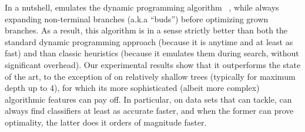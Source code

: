 \documentclass{article}
\begin{document}
In a nutshell, \budalg emulates the dynamic programming algorithm \dleight~\cite{dl8}, while always expanding non-terminal branches (a.k.a ``buds'') before optimizing grown branches. As a result, this algorithm is in a sense strictly better than both the standard dynamic programming approach (because it is anytime and at least as fast) and than classic heuristics (because it emulates them during search, without significant overhead).
Our experimental results show that it outperforms the state of the art, to the exception of \murtree on relatively shallow trees (typically for maximum depth up to 4), for which its more sophisticated (albeit more complex) algorithmic features can pay off.
In particular, on data sets that \dleight can tackle, \budalg can always find classifiers at least as accurate faster, and when the former can prove optimality, the latter does it orders of magnitude faster.
\end{document}

